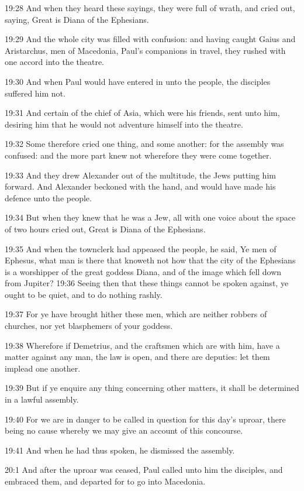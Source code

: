 19:28 And when they heard these sayings, they were full of wrath, and
cried out, saying, Great is Diana of the Ephesians.

19:29 And the whole city was filled with confusion: and having caught
Gaius and Aristarchus, men of Macedonia, Paul's companions in travel,
they rushed with one accord into the theatre.

19:30 And when Paul would have entered in unto the people, the
disciples suffered him not.

19:31 And certain of the chief of Asia, which were his friends, sent
unto him, desiring him that he would not adventure himself into the
theatre.

19:32 Some therefore cried one thing, and some another: for the
assembly was confused: and the more part knew not wherefore they were
come together.

19:33 And they drew Alexander out of the multitude, the Jews putting
him forward. And Alexander beckoned with the hand, and would have made
his defence unto the people.

19:34 But when they knew that he was a Jew, all with one voice about
the space of two hours cried out, Great is Diana of the Ephesians.

19:35 And when the townclerk had appeased the people, he said, Ye men
of Ephesus, what man is there that knoweth not how that the city of
the Ephesians is a worshipper of the great goddess Diana, and of the
image which fell down from Jupiter?  19:36 Seeing then that these
things cannot be spoken against, ye ought to be quiet, and to do
nothing rashly.

19:37 For ye have brought hither these men, which are neither robbers
of churches, nor yet blasphemers of your goddess.

19:38 Wherefore if Demetrius, and the craftsmen which are with him,
have a matter against any man, the law is open, and there are
deputies: let them implead one another.

19:39 But if ye enquire any thing concerning other matters, it shall
be determined in a lawful assembly.

19:40 For we are in danger to be called in question for this day's
uproar, there being no cause whereby we may give an account of this
concourse.

19:41 And when he had thus spoken, he dismissed the assembly.

20:1 And after the uproar was ceased, Paul called unto him the
disciples, and embraced them, and departed for to go into Macedonia.

